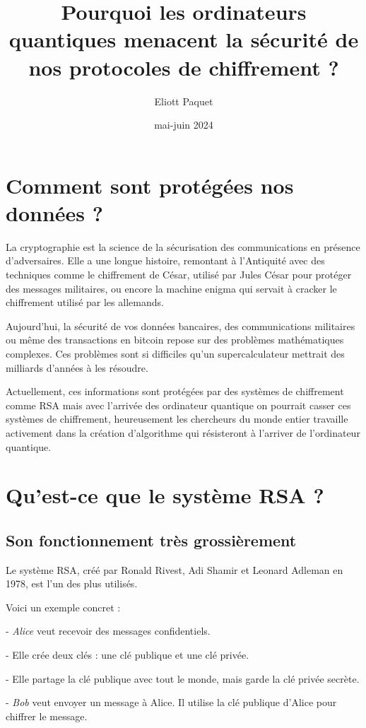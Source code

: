 \documentclass[a4paper,12pt]{article}
\title{Pourquoi les ordinateurs quantiques menacent la sécurité de nos protocoles de chiffrement ?}
\author{Eliott Paquet}
\date{mai-juin 2024}
\begin{document}
\maketitle
\clearpage

\tableofcontents
\newpage


\section{Comment sont protégées nos données ?}
La cryptographie est la science de la sécurisation des communications en présence d'adversaires. Elle a une longue histoire, remontant à l'Antiquité avec des techniques comme le chiffrement de César, utilisé par Jules César pour protéger des messages militaires, ou encore la machine enigma qui servait à cracker le chiffrement utilisé par les allemands.

Aujourd'hui, la sécurité de vos données bancaires, des communications militaires ou même des transactions en bitcoin repose sur des problèmes mathématiques complexes. Ces problèmes sont si difficiles qu'un supercalculateur mettrait des milliards d'années à les résoudre.


Actuellement, ces informations sont protégées par des systèmes de chiffrement comme RSA mais avec l'arrivée des ordinateur quantique on pourrait casser ces systèmes de chiffrement, heureusement les chercheurs du monde entier travaille activement dans la création d'algorithme qui résisteront à l'arriver de l'ordinateur quantique.

\section{Qu'est-ce que le système RSA ?}

\subsection{Son fonctionnement très grossièrement}
Le système RSA, créé par Ronald Rivest, Adi Shamir et Leonard Adleman en 1978, est l'un des plus utilisés.

Voici un exemple concret :

- \textit{Alice} veut recevoir des messages confidentiels.

- Elle crée deux clés : une clé publique et une clé privée.

- Elle partage la clé publique avec tout le monde, mais garde la clé privée secrète.

- \textit{Bob} veut envoyer un message à Alice. Il utilise la clé publique d'Alice pour chiffrer le message.
\end{document}

